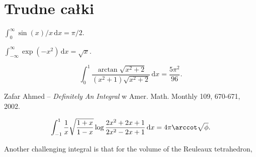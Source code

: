 \section{Trudne całki}

\begin{integral}
    $\int_0^\infty \sin(x) / x \,\mathrm{d}x = \pi/2$.
\end{integral}

\begin{integral}
    $\int_{-\infty}^\infty \exp(-x^2) \,\mathrm{d}x = \sqrt x$.
\end{integral}

\begin{integral}
    \begin{equation}
        \int_0^1 \frac{\arctan \sqrt{x^2+2}}{(x^2+1) \sqrt{x^2+2}} \,\mathrm{d}x = \frac{5\pi^2}{96}.
    \end{equation}
\end{integral}

\begin{solution}
    Zafar Ahmed -- \emph{Definitely An Integral} w Amer. Math. Monthly 109, 670-671, 2002.
\end{solution}

\begin{integral}
    \begin{equation}
        \int_{-1}^1 \frac{1}{x} \sqrt{\frac{1+x}{1-x}} \log \frac{2x^2+2x+1}{2x^2-2x+1} \,\mathrm{d}x = 4 \pi \arccot \sqrt{\phi}.
    \end{equation}
\end{integral}




Another challenging integral is that for the volume of the Reuleaux tetrahedron,





